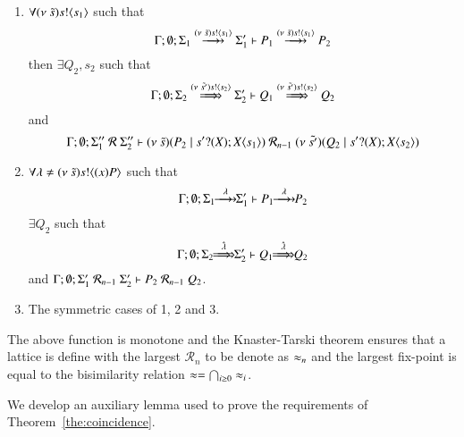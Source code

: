 \begin{definition}
\begin{itemize}
\begin{enumerate}
				\item	$\forall (\nu\ \tilde{s}) s ! \langle s_1 \rangle$ such that
					\[
						\Gamma; \emptyset; \Sigma_1 \hby{\news{\tilde{s}} \bactout{s}{s_1}} \Sigma_1' \proves P_1 \hby{\news{\tilde{s}} \bactout{s}{s_1}} P_2
					\]
					then $\exists Q_2, s_2$ such that
					\[
						\Gamma; \emptyset; \Sigma_2 \Hby{\news{\tilde{s'}} \bactout{s}{s_2}} \Sigma_2' \proves Q_1 \Hby{\news{\tilde{s'}} \bactout{s}{s_2}} Q_2
					\]
					and
					\[
						\Gamma; \emptyset; \Sigma_1''\ \mathcal{R}\ \Sigma_2'' \proves
						\newsp{\tilde{s}}{P_2 \Par \nametrigger{s'}{s_1}}  %
						\ \mathcal{R}_{n-1}\ 
						\newsp{\tilde{s'}}{Q_2 \Par \nametrigger{s'}{s_2}} %
					\]


				\item	$\forall \lambda \not= (\nu\ \tilde{s}) s ! \langle (x)P \rangle$ such that
					\[
						\Gamma; \emptyset; \Sigma_1 \hby{\lambda} \Sigma_1' \proves P_1 \hby{\lambda} P_2
					\]
					$\exists Q_2$ such that 
					\[
						\Gamma; \emptyset; \Sigma_2 \Hby{\hat{\lambda}} \Sigma_2' \proves Q_1 \Hby{\hat{\lambda}} Q_2
					\]
					and
					$\Gamma; \emptyset; \Sigma_1'\ \mathcal{R}_{n-1}\ \Sigma_2' \vdash P_2\ \mathcal{R}_{n-1}\ Q_2$.

				\item	The symmetric cases of 1, 2 and 3.
			\end{enumerate}
	\end{itemize}
	\noi The above function is monotone and the Knaster-Tarski theorem ensures that a lattice is define
	with the largest $\mathcal{R}_n$ to be denote as $\approx_n$ and the largest fix-point is equal to the
	bisimilarity relation $\approx = \bigcap_{i \geq 0} \approx_i$.
\end{definition}


We develop an auxiliary lemma used to prove
the requirements of Theorem~\ref{the:coincidence}.

